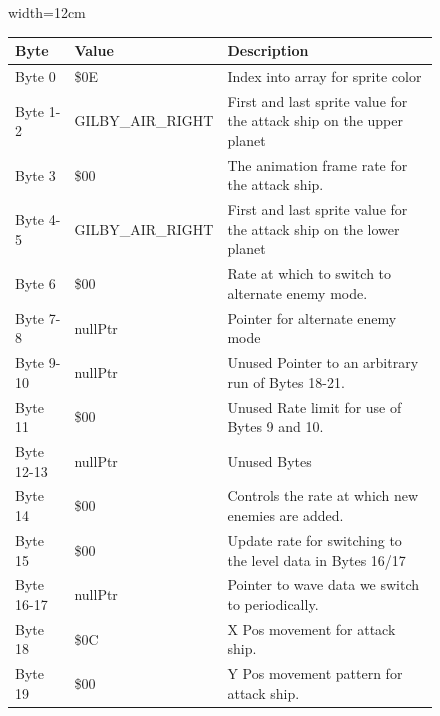\begin{figure}[H]
  {
  \setlength{\tabcolsep}{3.0pt}
  \setlength\cmidrulewidth{\heavyrulewidth} %
  \begin{adjustbox}{width=12cm}

\begin{tabular}{lll}
\toprule
 Byte       & Value                    & Description                                                         \\
\midrule
 Byte 0     & \$0E                      & Index into array for sprite color                                   \\
 Byte 1-2   & GILBY\_AIR\_RIGHT     & First and last sprite value for the attack ship on the upper planet \\
 Byte 3     & \$00                      & The animation frame rate for the attack ship.                       \\
 Byte 4-5   & GILBY\_AIR\_RIGHT     & First and last sprite value for the attack ship on the lower planet \\
 Byte 6     & \$00                      & Rate at which to switch to alternate enemy mode.                    \\
 Byte 7-8   & nullPtr                  & Pointer for alternate enemy mode                                    \\
 Byte 9-10  & nullPtr                  & Unused Pointer to an arbitrary run of Bytes 18-21.                  \\
 Byte 11    & \$00                      & Unused Rate limit for use of Bytes 9 and 10.                        \\
 Byte 12-13 & nullPtr                  & Unused Bytes                                                        \\
 Byte 14    & \$00                      & Controls the rate at which new enemies are added.                   \\
 Byte 15    & \$00                      & Update rate for switching to the level data in Bytes 16/17          \\
 Byte 16-17 & nullPtr                  & Pointer to wave data we switch to periodically.                     \\
 Byte 18    & \$0C                      & X Pos movement for attack ship.                                     \\
 Byte 19    & \$00                      & Y Pos movement pattern for attack ship.                             \\

\end{tabular}
\end{adjustbox}}
\end{figure}
